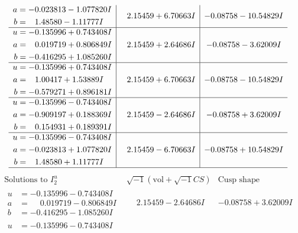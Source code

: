 \documentclass[1p]{elsarticle_modified}
\theoremstyle{definition}
\newcommand{\I}{\sqrt{-1}}
\begin{document}
$$\begin{array}{c|c|c}
\begin{aligned}
a &= -0.023813 - 1.077820 I \\
b &= \phantom{-}1.48580 - 1.11777 I\end{aligned}
 & \phantom{-}2.15459 + 6.70663 I & -0.08758 - 10.54829 I \\ \hline\begin{aligned}
u &= -0.135996 + 0.743408 I \\
a &= \phantom{-}0.019719 + 0.806849 I \\
b &= -0.416295 + 1.085260 I\end{aligned}
 & \phantom{-}2.15459 + 2.64686 I & -0.08758 - 3.62009 I \\ \hline\begin{aligned}
u &= -0.135996 + 0.743408 I \\
a &= \phantom{-}1.00417 + 1.53889 I \\
b &= -0.579271 + 0.896181 I\end{aligned}
 & \phantom{-}2.15459 + 6.70663 I & -0.08758 - 10.54829 I \\ \hline\begin{aligned}
u &= -0.135996 - 0.743408 I \\
a &= -0.909197 + 0.188369 I \\
b &= \phantom{-}0.154931 + 0.189391 I\end{aligned}
 & \phantom{-}2.15459 - 2.64686 I & -0.08758 + 3.62009 I \\ \hline\begin{aligned}
u &= -0.135996 - 0.743408 I \\
a &= -0.023813 + 1.077820 I \\
b &= \phantom{-}1.48580 + 1.11777 I\end{aligned}
 & \phantom{-}2.15459 - 6.70663 I & -0.08758 + 10.54829 I\\
 \hline 
 \end{array}$$\newpage$$\begin{array}{c|c|c}  
\text{Solutions to }I^u_{2}& \I (\text{vol} + \sqrt{-1}CS) & \text{Cusp shape}\\
 \hline 
\begin{aligned}
u &= -0.135996 - 0.743408 I \\
a &= \phantom{-}0.019719 - 0.806849 I \\
b &= -0.416295 - 1.085260 I\end{aligned}
 & \phantom{-}2.15459 - 2.64686 I & -0.08758 + 3.62009 I \\ \hline\begin{aligned}
u &= -0.135996 - 0.743408 I \\

\end{aligned}
\end{array}$$
\end{document}

